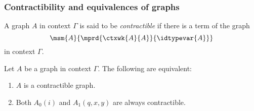 \begin{comment}
\begin{defn}
For any graph $\Gamma$ there is a graph $\tffam{\Gamma}$ in context 
$\gobjclass$ defined by
\begin{align*}
(\tffam{\Gamma})_0 & \defeq \lam{X}X\to\Gamma_0\\
(\tffam{\Gamma})_1(X,Y,R) & \defeq \lam{f}{g}\prd*{x:X}*{y:Y}R(x,y)\to\Gamma_1(f(x),g(y)).
\end{align*}
\end{defn}

\begin{rmk}
A term $D$ of $\msm{\gobjclass}{\tffam{\Gamma}}$ consists of a term
$\pairr{\Delta_0,f_0}$ of type
\begin{equation*}
\msm{\gobjclass}{\tffam{\Gamma}}_0\jdeq \sm{\Delta_0:\type}\Delta_0\to\Gamma_0
\end{equation*}
and a term $\pairr{\Delta_1,f_1}$ of type
\begin{equation*}
\msm{\gobjclass}{\tffam{\Gamma}}_1(q)\jdeq \sm{\Delta_1}
\end{equation*}
\end{rmk}

\begin{defn}
There is a graph morphism
\begin{equation*}
\graphcharmapfunc{\Gamma} : \sm{\gobjclass}
\end{equation*}
\end{defn}
\end{comment}

\subsubsection{Contractibility and equivalences of graphs}

\begin{defn}
A graph $A$ in context $\Gamma$ is said to be \emph{contractible} if there
is a term of the graph
\begin{equation*}
\msm{A}{\mprd{\ctxwk{A}{A}}{\idtypevar{A}}}
\end{equation*}
in context $\Gamma$.
\end{defn}

\begin{lem}\label{lem:contractible-graphs}
Let $A$ be a graph in context $\Gamma$. The following are equivalent:
\begin{enumerate}
\item $A$ is a contractible graph.
\item Both $A_0(i)$ and $A_1(q,x,y)$ are always contractible.
\end{enumerate}
\end{lem}

